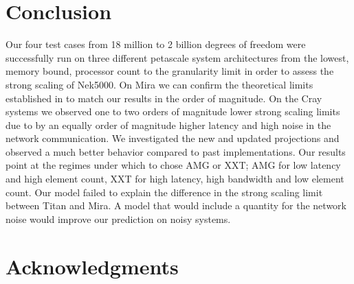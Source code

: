 \documentclass{sig-alternate}
\begin{document}
\section{Conclusion}
Our four test cases from 18 million to 2 billion degrees of freedom were
successfully run on three different petascale system architectures from the
lowest, memory bound, processor count to the granularity limit in order to
assess the strong scaling of Nek5000. On Mira we can confirm the theoretical
limits established in \cite{fischer:scaling} to match our results in the order
of magnitude. On the Cray systems we observed one to two orders of magnitude
lower strong scaling limits due to by an equally order of magnitude higher
latency and high noise in the network communication. We investigated the new
and updated projections and observed a much better behavior compared to past
implementations. Our results point at the regimes under which to chose AMG or
XXT; AMG for low latency and high element count, XXT for high latency, high
bandwidth and low element count. Our model failed to explain the difference in
the strong scaling limit between Titan and Mira. A model that would include a
quantity for the network noise would improve our prediction on noisy systems. 

\section{Acknowledgments}

%

%
%

\end{document}
